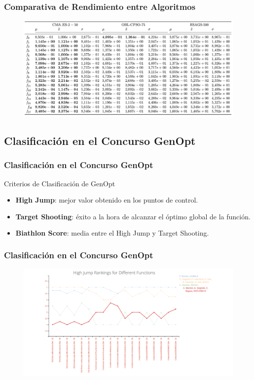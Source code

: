 \begin{frame}
\frametitle{Comparativa de Rendimiento entre Algoritmos}
\begin{figure}
  \centering
	\includegraphics[scale=0.3]{img/finalcmp}
\end{figure}
\end{frame}

\subsection{Clasificación en el Concurso GenOpt}
\begin{frame}
\frametitle{Clasificación en el Concurso GenOpt}
\begin{block}{Criterios de Clasificación de GenOpt}
\begin{itemize}
    	  	\item \textbf{High Jump}: mejor valor obtenido en los puntos de control.
    	  	\item \textbf{Target Shooting}: éxito a la hora de alcanzar el óptimo global de la función.
    	  	\item \textbf{Biathlon Score}: media entre el High Jump y Target Shooting.
\end{itemize}
\end{block}
\end{frame}

\begin{frame}
\frametitle{Clasificación en el Concurso GenOpt}
\begin{figure}[!ht]
  \centering
  \includegraphics[scale=0.3]{img/highjump}
\end{figure}
\end{frame}